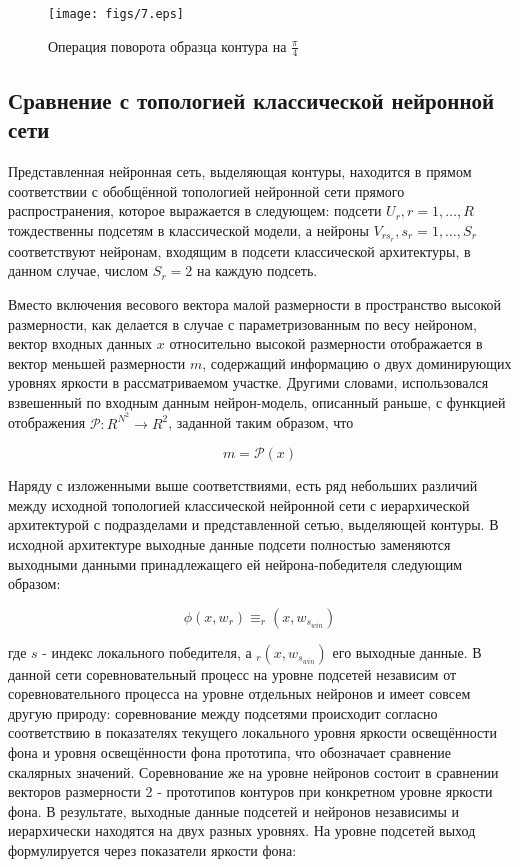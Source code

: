 \documentclass[a4paper,12pt]{report}
\begin{document}
\begin{center}
\begin{figure}[!t]
\begin{center}
\texttt{[image: figs/7.eps]}
\end{center}\caption{Операция поворота образца контура на $\frac{\pi}{4}$}
\label{rotator}
\end{figure}
\end{center}

\subsection{Сравнение с топологией классической нейронной сети}

Представленная нейронная сеть, выделяющая контуры, находится в прямом соответствии с обобщённой топологией нейронной сети прямого распространения, которое выражается в следующем: подсети $U_r,r=1,\dots, R$ тождественны подсетям в классической модели, а нейроны $V_{r s_r},s_r=1,\dots , S_r$ соответствуют нейронам, входящим в подсети классической архитектуры, в данном случае, числом $S_r=2$ на каждую подсеть.

Вместо включения весового вектора малой размерности в пространство высокой размерности, как делается в случае с параметризованным по весу нейроном, вектор входных данных $x$ относительно высокой размерности отображается в вектор меньшей размерности $m$, содержащий информацию о двух доминирующих уровнях яркости в рассматриваемом участке. Другими словами, использовался взвешенный по входным данным нейрон-модель, описанный раньше, с функцией отображения $\mathcal{P}\colon  R^{N^2}\to R^2$, заданной таким образом, что 

\begin{equation}
m=\mathcal{P}(x)
\end{equation} 

Наряду с изложенными выше соответствиями, есть ряд небольших различий между исходной топологией классической нейронной сети с иерархической архитектурой с подразделами и представленной сетью, выделяющей контуры. В  исходной архитектуре выходные данные подсети полностью заменяются выходными данными принадлежащего ей нейрона-победителя следующим образом:

\begin{equation}
\phi (x,w_r)\equiv _r(x,w_{s_{win}})
\end{equation}

где $s$ - индекс локального победителя, а $_r(x,w_{s_{win}})$ его выходные данные. В данной сети соревновательный процесс на уровне подсетей независим от соревновательного процесса на уровне отдельных нейронов и имеет совсем другую природу: соревнование между подсетями происходит согласно соответствию в показателях текущего локального уровня яркости освещённости фона и уровня освещённости фона прототипа, что обозначает сравнение скалярных значений. Соревнование же на уровне нейронов состоит в сравнении векторов размерности 2 - прототипов контуров при конкретном уровне яркости фона. В результате, выходные данные подсетей и нейронов независимы и  иерархически находятся на двух разных уровнях. На уровне подсетей  выход формулируется через показатели яркости фона: 
\end{document}
